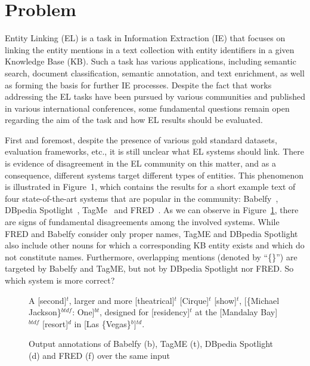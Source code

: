 \documentclass[sigconf]{acmart}
\begin{document}
\section{Problem}

Entity Linking (EL) is a task in Information Extraction (IE) that focuses on linking the entity mentions in a text collection with entity identifiers in a given Knowledge Base (KB). Such a task has various applications, including semantic search, document classification, semantic annotation, and text enrichment, as well as forming the basis for further IE processes. Despite the fact that works addressing the EL tasks have been pursued by various communities and published in various international conferences, some fundamental questions remain open regarding the aim of the task and how EL results should be evaluated.

First and foremost, despite the presence of various gold standard datasets, evaluation frameworks, etc., it is still unclear what EL systems should link. There is evidence of disagreement in the EL community on this matter, and as a consequence, different systems target different types of entities. This phenomenon is illustrated in Figure~1, which contains the results for a short example text of four state-of-the-art systems that are popular in the community: Babelfy~\cite{0001RN14}, DBpedia Spotlight~\cite{MendesJGB11}, TagMe~\cite{FerraginaS10} and FRED~\cite{GangemiPRNDM17}. As we can observe in Figure~\ref{fig:exp1}, there are signs of fundamental disagreements among the involved systems. While FRED and Babelfy consider only proper names, TagME and DBpedia Spotlight also include other nouns for which a corresponding KB entity exists and which do not constitute names. Furthermore, overlapping mentions (denoted by ``\{\}'') are targeted by Babelfy and TagME, but not by DBpedia Spotlight nor FRED. So which system is more correct?

\begin{figure}[!tb]
\begin{mdframed}
A [second]$^{t}$, larger and more [theatrical]$^{t}$ [Cirque]$^{t}$ [show]$^{t}$, [\{Michael Jackson\}$^{btdf}$: One]$^{bt}$, designed for [residency]$^{t}$ at the [Mandalay Bay]$^{btdf}$ [resort]$^{d}$ in [Las \{Vegas\}$^{b}$]$^{td}$.
\end{mdframed}
\caption{Output annotations of Babelfy (b), TagME (t), DBpedia Spotlight (d) and FRED (f) over the same input \label{fig:exp1}}
\end{figure}
\end{document}
